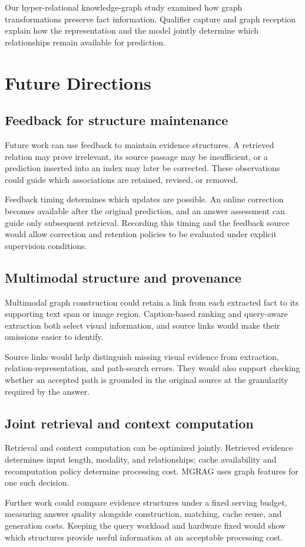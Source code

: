 Our hyper-relational knowledge-graph study examined how graph transformations preserve fact information. Qualifier capture and graph reception explain how the representation and the model jointly determine which relationships remain available for prediction.

\section{Future Directions}
\label{sec:conclusion:future}
\subsection{Feedback for structure maintenance}
Future work can use feedback to maintain evidence structures. A retrieved relation may prove irrelevant, its source passage may be insufficient, or a prediction inserted into an index may later be corrected. These observations could guide which associations are retained, revised, or removed.

Feedback timing determines which updates are possible. An online correction becomes available after the original prediction, and an answer assessment can guide only subsequent retrieval. Recording this timing and the feedback source would allow correction and retention policies to be evaluated under explicit supervision conditions.

\subsection{Multimodal structure and provenance}
Multimodal graph construction could retain a link from each extracted fact to its supporting text span or image region. Caption-based ranking and query-aware extraction both select visual information, and source links would make their omissions easier to identify.

Source links would help distinguish missing visual evidence from extraction, relation-representation, and path-search errors. They would also support checking whether an accepted path is grounded in the original source at the granularity required by the answer.

\subsection{Joint retrieval and context computation}
Retrieval and context computation can be optimized jointly. Retrieved evidence determines input length, modality, and relationships; cache availability and recomputation policy determine processing cost. MGRAG uses graph features for one such decision.

Further work could compare evidence structures under a fixed serving budget, measuring answer quality alongside construction, matching, cache reuse, and generation costs. Keeping the query workload and hardware fixed would show which structures provide useful information at an acceptable processing cost.
